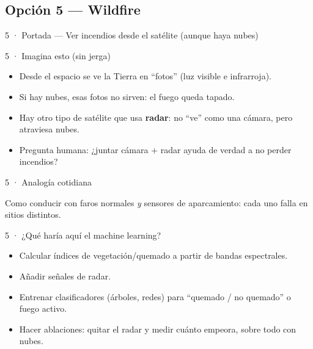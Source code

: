 \subsection{Opción 5 --- Wildfire}

\begin{frame}{5 · Portada --- Ver incendios desde el satélite (aunque haya nubes)}
\end{frame}

\begin{frame}{5 · Imagina esto (sin jerga)}
  \begin{itemize}
    \item Desde el espacio se ve la Tierra en ``fotos'' (luz visible e infrarroja).
    \item Si hay nubes, esas fotos no sirven: el fuego queda tapado.
    \item Hay otro tipo de satélite que usa \textbf{radar}: no ``ve'' como una cámara, pero atraviesa nubes.
    \item Pregunta humana: ¿juntar cámara + radar ayuda de verdad a no perder incendios?
  \end{itemize}
\end{frame}

\begin{frame}{5 · Analogía cotidiana}
  \begin{center}
  \end{center}
  \vspace{0.4em}
  Como conducir con faros normales \emph{y} sensores de aparcamiento: cada uno falla en sitios distintos.
\end{frame}

\begin{frame}{5 · ¿Qué haría aquí el machine learning?}
  \begin{itemize}
    \item Calcular índices de vegetación/quemado a partir de bandas espectrales.
    \item Añadir señales de radar.
    \item Entrenar clasificadores (árboles, redes) para ``quemado / no quemado'' o fuego activo.
    \item Hacer ablaciones: quitar el radar y medir cuánto empeora, sobre todo con nubes.
  \end{itemize}
\end{frame}


